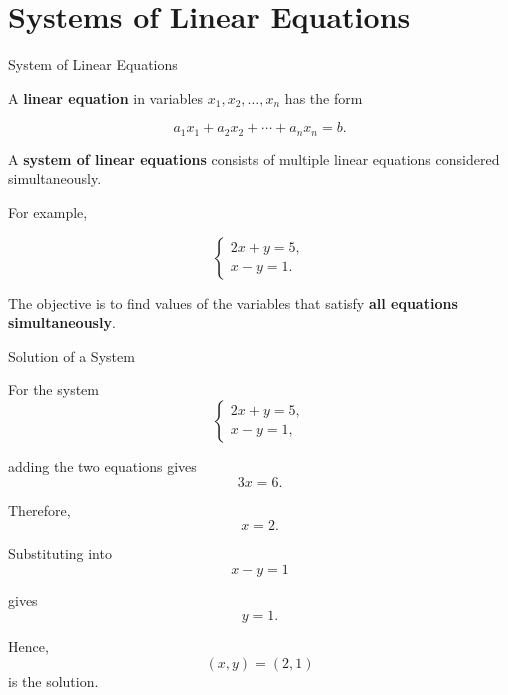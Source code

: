 

\section{Systems of Linear Equations}


\begin{frame}{System of Linear Equations}

A \textbf{linear equation} in variables
$x_1,x_2,\ldots,x_n$ has the form

\[
a_1x_1+a_2x_2+\cdots+a_nx_n=b.
\]

A \textbf{system of linear equations} consists of
multiple linear equations considered simultaneously.

\vspace{0.4cm}

For example,

\[
\begin{cases}
2x+y=5,\\
x-y=1.
\end{cases}
\]

\vspace{0.3cm}

The objective is to find values of the variables that
satisfy \textbf{all equations simultaneously}.

\end{frame}



\begin{frame}{Solution of a System}

For the system
\vspace{-0.1cm}
\[
\begin{cases}
2x+y=5,\\
x-y=1,
\end{cases}
\]

adding the two equations gives
\vspace{-0.1cm}
\[
3x=6.
\]

Therefore,
\vspace{-0.1cm}
\[
x=2.
\]

Substituting into
\vspace{-0.1cm}
\[
x-y=1
\]

gives
\vspace{-0.1cm}
\[
y=1.
\]

Hence,
\vspace{-0.1cm}
\[
\boxed{
(x,y)=(2,1)
}
\]
\vspace{-0.1cm}
is the solution.

\end{frame}


